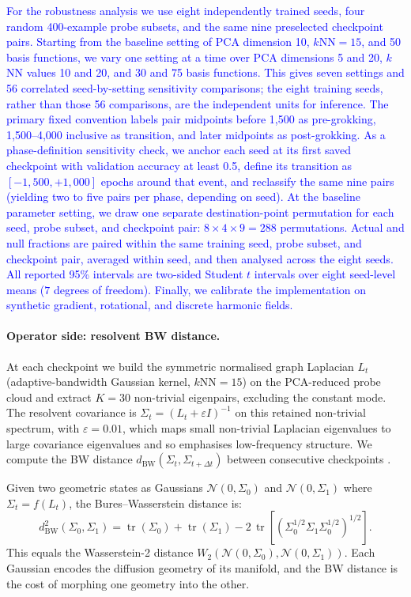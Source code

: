 \documentclass[11pt]{article}
\newcommand{\BW}{\mathrm{BW}}
\newcommand{\addedtext}[1]{\textcolor{blue}{#1}}
\theoremstyle{remark}
\begin{document}
\addedtext{For the robustness analysis we use eight independently trained seeds, four random 400-example probe subsets, and the same nine preselected checkpoint pairs. Starting from the baseline setting of PCA dimension 10, $k$NN${}=15$, and 50 basis functions, we vary one setting at a time over PCA dimensions 5 and 20, $k$NN values 10 and 20, and 30 and 75 basis functions. This gives seven settings and 56 correlated seed-by-setting sensitivity comparisons; the eight training seeds, rather than those 56 comparisons, are the independent units for inference. The primary fixed convention labels pair midpoints before 1{,}500 as pre-grokking, 1{,}500--4{,}000 inclusive as transition, and later midpoints as post-grokking. As a phase-definition sensitivity check, we anchor each seed at its first saved checkpoint with validation accuracy at least 0.5, define its transition as $[-1{,}500,+1{,}000]$ epochs around that event, and reclassify the same nine pairs (yielding two to five pairs per phase, depending on seed). At the baseline parameter setting, we draw one separate destination-point permutation for each seed, probe subset, and checkpoint pair: $8\times4\times9=288$ permutations. Actual and null fractions are paired within the same training seed, probe subset, and checkpoint pair, averaged within seed, and then analysed across the eight seeds. All reported 95\% intervals are two-sided Student $t$ intervals over eight seed-level means ($7$ degrees of freedom). Finally, we calibrate the implementation on synthetic gradient, rotational, and discrete harmonic fields.}

\paragraph{Operator side: resolvent BW distance.} At each checkpoint we build the symmetric normalised graph Laplacian $L_t$ (adaptive-bandwidth Gaussian kernel, $k$NN${}=15$) on the PCA-reduced probe cloud \citep{coifman2006diffusion} and extract $K = 30$ non-trivial eigenpairs, excluding the constant mode. The resolvent covariance is $\Sigma_t = (L_t + \varepsilon I)^{-1}$ on this retained non-trivial spectrum, with $\varepsilon = 0.01$, which maps small non-trivial Laplacian eigenvalues to large covariance eigenvalues and so emphasises low-frequency structure. We compute the BW distance $d_{\BW}(\Sigma_t, \Sigma_{t+\Delta t})$ between consecutive checkpoints \citep{bhatia2019bures}.

Given two geometric states as Gaussians $\mathcal{N}(0, \Sigma_0)$ and $\mathcal{N}(0, \Sigma_1)$ where $\Sigma_t = f(L_t)$, the Bures--Wasserstein distance \citep{bhatia2019bures} is:
\begin{equation}
d_{\BW}^2(\Sigma_0, \Sigma_1)
= \operatorname{tr}(\Sigma_0) + \operatorname{tr}(\Sigma_1)
- 2\,\operatorname{tr}\!\left[\left(\Sigma_0^{1/2} \Sigma_1 \Sigma_0^{1/2}\right)^{1/2}\right].
\label{eq:bw-distance}
\end{equation}
This equals the Wasserstein-2 distance $W_2(\mathcal{N}(0,\Sigma_0), \mathcal{N}(0,\Sigma_1))$. Each Gaussian encodes the diffusion geometry of its manifold, and the BW distance is the cost of morphing one geometry into the other.
\end{document}
